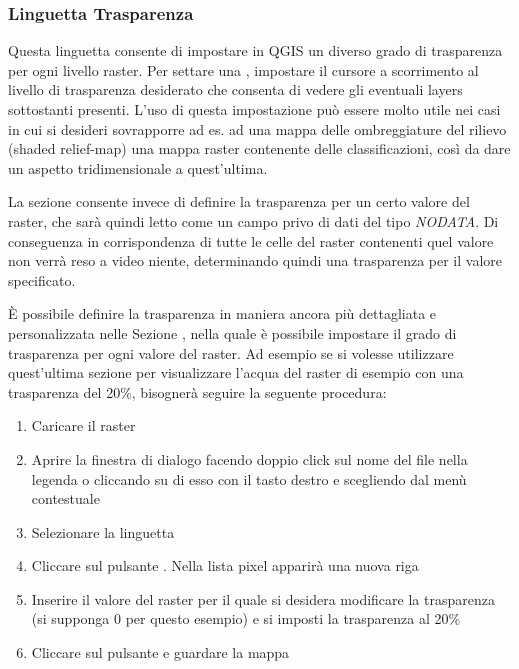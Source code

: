 \subsubsection{Linguetta Trasparenza} \label{rastertab:transparency}

Questa linguetta consente di impostare in QGIS un diverso grado di trasparenza per ogni livello raster.
Per settare una , impostare il cursore a scorrimento al livello di trasparenza desiderato
che consenta di vedere gli eventuali layers sottostanti presenti. 
L'uso di questa impostazione può essere molto utile nei casi in cui si
desideri sovrapporre ad es. ad una mappa delle ombreggiature del rilievo (shaded
relief-map) una mappa raster contenente delle classificazioni, così da dare un
aspetto tridimensionale a quest'ultima.

La sezione  consente invece di definire la trasparenza per un certo valore del raster, che sarà quindi letto come un campo privo di dati del tipo {\em NODATA}. Di
conseguenza in corrispondenza di tutte le celle del raster contenenti quel
valore non verrà reso a video niente, determinando quindi una trasparenza per
il valore specificato.

È possibile definire la trasparenza in maniera ancora più dettagliata e
personalizzata nelle Sezione , nella quale è possibile impostare il grado di trasparenza per
ogni valore del raster.
Ad esempio se si volesse utilizzare quest'ultima sezione per visualizzare l'acqua del raster di esempio 
con una trasparenza del 20\%, bisognerà seguire la seguente procedura:

\begin{enumerate}
 \item Caricare il raster 
 \item Aprire la finestra di dialogo  facendo doppio click
 sul nome del file nella legenda o cliccando su di esso con il tasto destro e
 scegliendo  dal menù contestuale
 \item Selezionare la linguetta 
 \item \label{enum:add} Cliccare sul pulsante
 . Nella lista
 pixel apparirà una nuova riga
 \item \label{enum:transp} Inserire il valore del raster per il quale si
 desidera modificare la trasparenza (si supponga 0 per questo esempio) e si
 imposti la trasparenza al 20\%
 \item Cliccare sul pulsante  e guardare la mappa
\end{enumerate}

